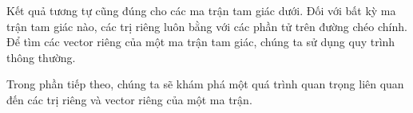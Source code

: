 Kết quả tương tự cũng đúng cho các ma trận tam giác dưới. Đối với bất kỳ ma trận tam giác nào, các trị riêng luôn bằng với các phần tử trên đường chéo chính. Để tìm các vector riêng của một ma trận tam giác, chúng ta sử dụng quy trình thông thường.

Trong phần tiếp theo, chúng ta sẽ khám phá một quá trình quan trọng liên quan đến các trị riêng và vector riêng của một ma trận.

